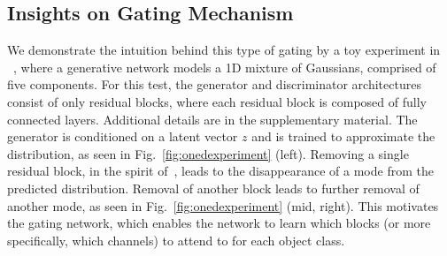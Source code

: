 \subsection{Insights on Gating Mechanism}
We demonstrate the intuition behind this type of gating by a toy experiment in ~, where a generative network models a 1D mixture of Gaussians, comprised of five components. 
For this test, the generator and discriminator architectures consist of only residual blocks, where each residual block is composed of fully connected layers. 
Additional details are in the supplementary material. 
%
The generator is conditioned on a latent vector $z$ and is trained to approximate the distribution, as seen in Fig.~\ref{fig:onedexperiment} (left). 
Removing a single residual block, in the spirit of~\cite{veit2016residual}, leads to the disappearance of a mode from the predicted distribution. 
Removal of another block leads to further removal of another mode, as seen in Fig.~\ref{fig:onedexperiment}  (mid, right). 
This motivates the gating network, which enables the network to learn which blocks (or more specifically, which channels) to attend to for each object class. %







